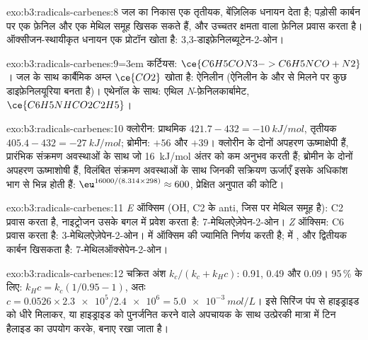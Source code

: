 \begin{solution}{exo:b3:radicals-carbenes:8}
जल का निकास एक तृतीयक, बेंज़िलिक धनायन देता है; पड़ोसी कार्बन पर एक फ़ेनिल
और एक मेथिल समूह खिसक सकते हैं, और उच्चतर क्षमता वाला फ़ेनिल प्रवास करता है।
ऑक्सीजन-स्थायीकृत धनायन एक प्रोटॉन खोता है: 3,3-डाइफ़ेनिलब्यूटेन-2-ओन।
\end{solution}

\begin{solution}{exo:b3:radicals-carbenes:9}\emergencystretch=3em
कर्टियस: $\ce{C6H5CON3 -> C6H5NCO + N2}$। जल के साथ कार्बैमिक अम्ल $\ce{CO2}$ खोता है: ऐनिलीन
(ऐनिलीन के और  से मिलने पर कुछ डाइफ़ेनिलयूरिया बनता है)। एथेनॉल के साथ: एथिल
\textit{N}-फ़ेनिलकार्बामेट, $\ce{C6H5NHCO2C2H5}$।
\end{solution}

\begin{solution}{exo:b3:radicals-carbenes:10}
क्लोरीन: प्राथमिक $421.7 - 432 = \qty{-10}{kJ/mol}$, तृतीयक $405.4 - 432 = \qty{-27}{kJ/mol}$; ब्रोमीन: $+56$ और
$+39$। क्लोरीन के दोनों अपहरण ऊष्माक्षेपी हैं, प्रारंभिक संक्रमण अवस्थाओं के साथ जो
\qty{16}{kJ/mol} अंतर को कम अनुभव करती हैं; ब्रोमीन के दोनों अपहरण ऊष्माशोषी हैं,
विलंबित संक्रमण अवस्थाओं के साथ जिनकी सक्रियण ऊर्जाएँ इसके अधिकांश भाग से भिन्न होती हैं:
$\eu^{16000/(8.314 \times 298)} \approx 600$, प्रेक्षित अनुपात की कोटि।
\end{solution}

\begin{solution}{exo:b3:radicals-carbenes:11}
\textit{E} ऑक्सिम (OH, C2 के anti, जिस पर मेथिल समूह है): C2 प्रवास करता है, नाइट्रोजन
उसके बगल में प्रवेश करता है: 7-मेथिलऐज़ेपेन-2-ओन। \textit{Z} ऑक्सिम: C6 प्रवास करता है: 3-मेथिलऐज़ेपेन-2-ओन।
 में ऑक्सिम की ज्यामिति निर्णय करती है;  में , और द्वितीयक कार्बन खिसकता है:
7-मेथिलऑक्सेपेन-2-ओन।
\end{solution}

\begin{solution}{exo:b3:radicals-carbenes:12}
चक्रित अंश $k_c/(k_c + k_H c)$: 0.91, 0.49 और 0.09। 95\,\% के लिए: $k_Hc = k_c(1/0.95 - 1)$, अतः
$c = 0.0526 \times \num{2.3e5}/\num{2.4e6} = \qty{5.0e-3}{mol/L}$। इसे सिरिंज पंप से हाइड्राइड को धीरे मिलाकर, या हाइड्राइड को
पुनर्जनित करने वाले अपचायक के साथ उत्प्रेरकी मात्रा में टिन हैलाइड का उपयोग करके, बनाए रखा जाता है।
\end{solution}

